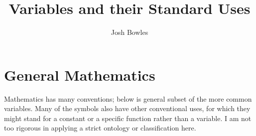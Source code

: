 \documentclass{article}
\begin{document}
\title{Variables and their Standard Uses}
\author{Josh Bowles}

\maketitle 

\section{General Mathematics}
Mathematics has many conventions; below is general subset of the more common variables. Many of the symbols also have other conventional uses, for which they might stand for a constant or a specific function rather than a variable. I am not too rigorous in applying a strict ontology or classification here.\\
\end{document}
